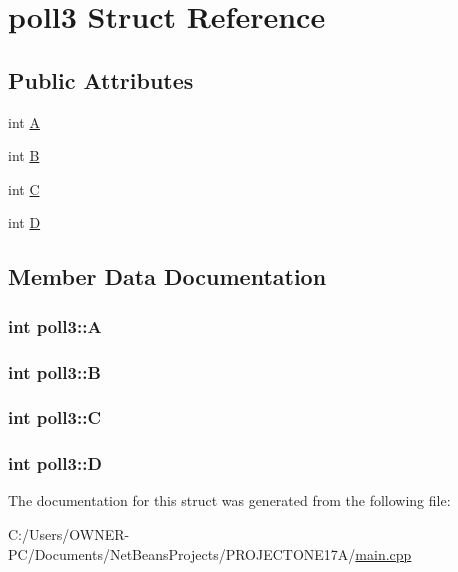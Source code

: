 \hypertarget{structpoll3}{\section{poll3 Struct Reference}
\label{structpoll3}
}
\subsection*{Public Attributes}
\begin{DoxyCompactItemize}
\item 
int \hyperlink{structpoll3_a64ec4ebba602637e15e79d6c859d07e0}{A}
\item 
int \hyperlink{structpoll3_a488704db751bb4510a592c5282464180}{B}
\item 
int \hyperlink{structpoll3_a0a78ac9f79531256f42e4ef31d1f0be9}{C}
\item 
int \hyperlink{structpoll3_a0a07fd52df62b86217898b253849dc42}{D}
\end{DoxyCompactItemize}


\subsection{Member Data Documentation}
\hypertarget{structpoll3_a64ec4ebba602637e15e79d6c859d07e0}{
\subsubsection[{A}]{\setlength{\rightskip}{0pt plus 5cm}int poll3\+::\+A}}\label{structpoll3_a64ec4ebba602637e15e79d6c859d07e0}
\hypertarget{structpoll3_a488704db751bb4510a592c5282464180}{
\subsubsection[{B}]{\setlength{\rightskip}{0pt plus 5cm}int poll3\+::\+B}}\label{structpoll3_a488704db751bb4510a592c5282464180}
\hypertarget{structpoll3_a0a78ac9f79531256f42e4ef31d1f0be9}{
\subsubsection[{C}]{\setlength{\rightskip}{0pt plus 5cm}int poll3\+::\+C}}\label{structpoll3_a0a78ac9f79531256f42e4ef31d1f0be9}
\hypertarget{structpoll3_a0a07fd52df62b86217898b253849dc42}{
\subsubsection[{D}]{\setlength{\rightskip}{0pt plus 5cm}int poll3\+::\+D}}\label{structpoll3_a0a07fd52df62b86217898b253849dc42}


The documentation for this struct was generated from the following file\+:\begin{DoxyCompactItemize}
\item 
C\+:/\+Users/\+O\+W\+N\+E\+R-\/\+P\+C/\+Documents/\+Net\+Beans\+Projects/\+P\+R\+O\+J\+E\+C\+T\+O\+N\+E17\+A/\hyperlink{main_8cpp}{main.\+cpp}\end{DoxyCompactItemize}

